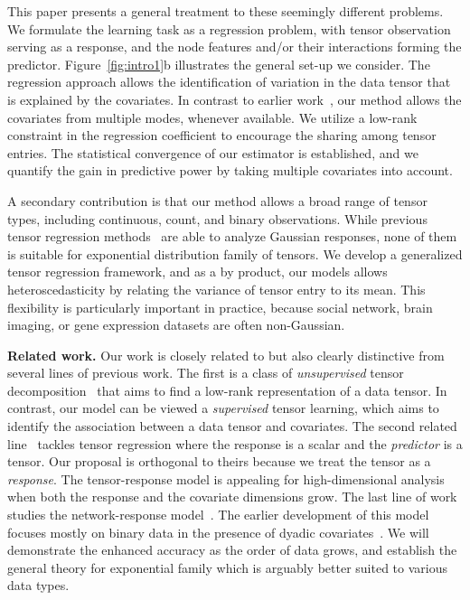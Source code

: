 \documentclass{article}
\theoremstyle{plain}
\theoremstyle{definition}
\begin{document}
This paper presents a general treatment to these seemingly different problems. We formulate the learning task as a regression problem, with tensor observation serving as a response, and the node features and/or their interactions forming the predictor. Figure~\ref{fig:intro1}b illustrates the general set-up we consider. The regression approach allows the identification of variation in the data tensor that is explained by the covariates. In contrast to earlier work~\cite{rabusseau2016low,yu2016learning}, our method allows the covariates from multiple modes, whenever available. We utilize a low-rank constraint in the regression coefficient to encourage the sharing among tensor entries. The statistical convergence of our estimator is established, and we quantify the gain in predictive power by taking multiple covariates into account. 


A secondary contribution is that our method allows a broad range of tensor types, including continuous, count, and binary observations. While previous tensor regression methods~\cite{zhao2012higher,yu2016learning} are able to analyze Gaussian responses, none of them is suitable for exponential distribution family of tensors. We develop a generalized tensor regression framework, and as a by product, our models allows heteroscedasticity by relating the variance of tensor entry to its mean.  This flexibility is particularly important in practice, because social network, brain imaging, or gene expression datasets are often non-Gaussian.


{\bf Related work.} Our work is closely related to but also clearly distinctive from several lines of previous work. The first is a class of \emph{unsupervised} tensor decomposition~\cite{de2000multilinear,hong2018generalized,zhang2018tensor} that aims to find a low-rank representation of a data tensor. In contrast, our model can be viewed a \emph{supervised} tensor learning, which aims to identify the association between a data tensor and covariates. The second related line~\cite{zhou2013tensor,chen2019non} tackles tensor regression where the response is a scalar and the \emph{predictor} is a tensor. Our proposal is orthogonal to theirs because we treat the tensor as a \emph{response}. The tensor-response model is appealing for high-dimensional analysis when both the response and the covariate dimensions grow. The last line of work studies the network-response model~\cite{rabusseau2016low, li2017parsimonious}. The earlier development of this model focuses mostly on binary data in the presence of dyadic covariates~\cite{hoff2005bilinear}. We will demonstrate the enhanced accuracy as the order of data grows, and establish the general theory for exponential family which is arguably better suited to various data types. 
\end{document}
